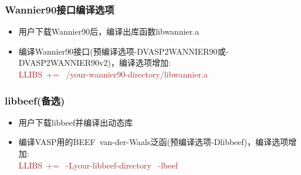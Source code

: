 \subsubsection{\rm{Wannier90}接口编译选项}
\begin{itemize}
	\item 用户下载\textrm{Wannier90}后，编译出库函数\textrm{libwannier.a}
	\item 编译\textrm{Wannier90}接口(预编译选项\textrm{-DVASP2WANNIER90}或\textrm{-DVASP2WANNIER90v2})，编译选项增加:\\
		\textcolor{brown}{\textrm{LLIBS~+=~ /your-wannier90-directory/libwannier.a}}
\end{itemize}
\subsubsection{\rm{libbeef}(备选)}
\begin{itemize}
	\item 用户下载\textrm{libbeef}并编译出动态库
	\item 编译\textrm{VASP}用的\textrm{BEEF~van-der-Waals}泛函(预编译选项\textrm{-Dlibbeef})，编译选项增加:\\
		\textcolor{brown}{\textrm{LLIBS~+=~ -Lyour-libbeef-directory~ -lbeef }}
\end{itemize}
